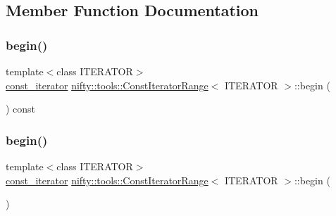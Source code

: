 \subsection{Member Function Documentation}
\mbox{\label{classnifty_1_1tools_1_1ConstIteratorRange_a76df7605834d379def3fa7d265a193d8}} 
\subsubsection{\texorpdfstring{begin()}{begin()}\hspace{0.1cm}{\footnotesize\ttfamily [1/2]}}
{\footnotesize\ttfamily template$<$class I\+T\+E\+R\+A\+T\+OR$>$ \\
\hyperlink{classnifty_1_1tools_1_1ConstIteratorRange_afb02141878a935f32f828810a2be648b}{const\+\_\+iterator} \hyperlink{classnifty_1_1tools_1_1ConstIteratorRange}{nifty\+::tools\+::\+Const\+Iterator\+Range}$<$ I\+T\+E\+R\+A\+T\+OR $>$\+::begin (\begin{DoxyParamCaption}{ }\end{DoxyParamCaption}) const\hspace{0.3cm}{\ttfamily [inline]}}

\mbox{\label{classnifty_1_1tools_1_1ConstIteratorRange_a58df2f679ea04772b59d8a29401b7fb9}} 
\subsubsection{\texorpdfstring{begin()}{begin()}\hspace{0.1cm}{\footnotesize\ttfamily [2/2]}}
{\footnotesize\ttfamily template$<$class I\+T\+E\+R\+A\+T\+OR$>$ \\
\hyperlink{classnifty_1_1tools_1_1ConstIteratorRange_afb02141878a935f32f828810a2be648b}{const\+\_\+iterator} \hyperlink{classnifty_1_1tools_1_1ConstIteratorRange}{nifty\+::tools\+::\+Const\+Iterator\+Range}$<$ I\+T\+E\+R\+A\+T\+OR $>$\+::begin (\begin{DoxyParamCaption}{ }\end{DoxyParamCaption})\hspace{0.3cm}{\ttfamily [inline]}}

